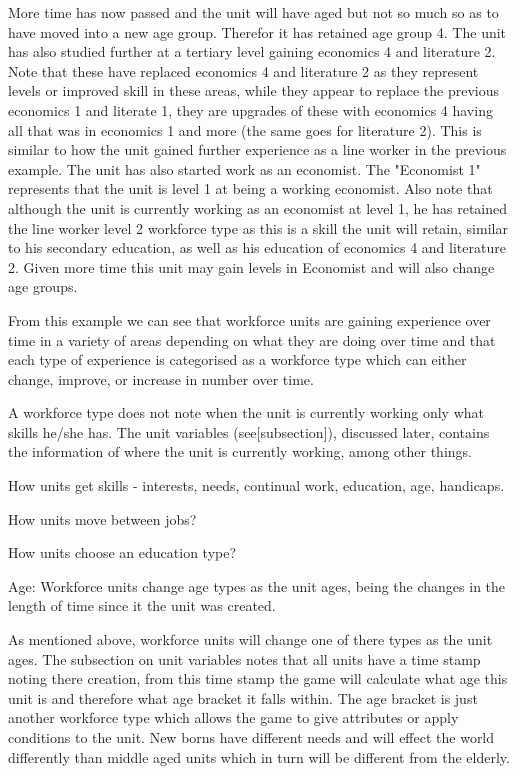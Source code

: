 More time has now passed and the unit will have aged but not so much so as to have moved into a new age group. Therefor it has retained age group 4. The unit has also studied further at a tertiary level gaining economics 4 and literature 2. Note that these have replaced economics 4 and literature 2 as they represent levels or improved skill in these areas, while they appear to replace the previous economics 1 and literate 1, they are upgrades of these with economics 4 having all that was in economics 1 and more (the same goes for literature 2). This is similar to how the unit gained further experience as a line worker in the previous example. The unit has also started work as an economist. The "Economist 1" represents that the unit is level 1 at being a working economist. Also note that although the unit is currently working as an economist at level 1, he has retained the line worker level 2 workforce type as this is a skill the unit will retain, similar to his secondary education, as well as his education of economics 4 and literature 2. Given more time this unit may gain levels in Economist and will also change age groups. 

From this example we can see that workforce units are gaining experience over time in a variety of areas depending on what they are doing over time and that each type of experience is categorised as a workforce type which can either change, improve, or increase in number over time. 

A workforce type does not note when the unit is currently working only what skills he/she has. The unit variables (see[subsection]), discussed later, contains the information of where the unit is currently working, among other things.

How units get skills - interests, needs, continual work, education, age, handicaps.

How units move between jobs?

How units choose an education type?


Age:
Workforce units change age types as the unit ages, being the changes in the length of time since it the unit was created. 

As mentioned above, workforce units will change one of there types as the unit ages. The subsection on unit variables notes that all units have a time stamp noting there creation, from this time stamp the game will calculate what age this unit is and therefore what age bracket it falls within. The age bracket is just another workforce type which allows the game to give attributes or apply conditions to the unit. New borns have different needs and will effect the world differently than middle aged units which in turn will be different from the elderly. 

